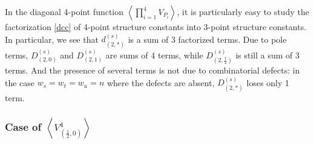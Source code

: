 \documentclass[12pt, a4paper]{article}
\theoremstyle{break}
\begin{document}
In the diagonal 4-point function $\left<\prod_{i=1}^4 V_{P_i}\right>$, it is particularly easy to study the factorization \eqref{dcc} of 4-point structure constants into 3-point structure constants. In particular, we see that $d^{(s)}_{(2,*)}$ is a sum of 3 factorized terms. Due to pole terms, $D^{(s)}_{(2,0)}$ and $D^{(s)}_{(2,1)}$ are sums of 4 terms, while $D^{(s)}_{(2,\frac12)}$ is still a sum of 3 terms. And the presence of several terms is not due to combinatorial defects: in the case $w_s=w_t=w_u=n$ where the defects are absent, $D^{(s)}_{(2,*)}$ loses only 1 term. 

\subsubsection[Case of $\left<V_{(\frac12, 0)}^4\right>$]{Case of $\left<V_{(\frac12, 0)}^4\right>$ \pice}
\end{document}
